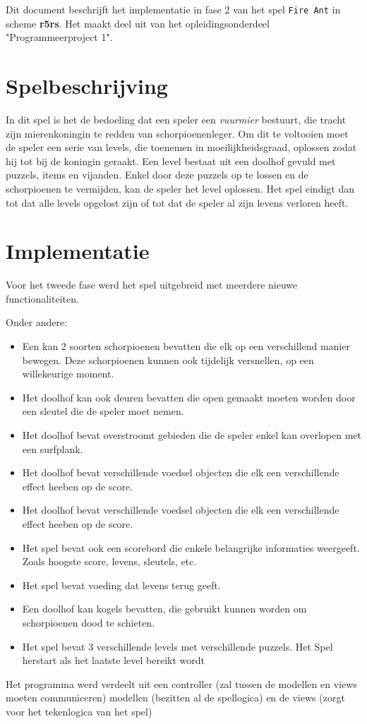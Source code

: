 Dit document beschrijft het implementatie in fase 2 van het spel \texttt{Fire Ant} in scheme \textbf{r5rs}.
Het maakt deel uit van het opleidingsonderdeel "Programmeerproject 1".

\section{Spelbeschrijving}
In dit spel is het de bedoeling dat een speler een \textit{vuurmier} bestuurt,
die tracht zijn mierenkoningin te redden van schorpioenenleger.
Om dit te voltooien moet de speler een serie van levels, die toenemen in moeilijkheidsgraad,
oplossen zodat hij tot bij de koningin geraakt.
Een level bestaat uit een doolhof gevuld met puzzels, items en vijanden.
Enkel door deze puzzels op te lossen en de schorpioenen te vermijden, kan de speler het level oplossen.
Het spel eindigt dan tot dat alle levels opgelost zijn of tot dat de speler al zijn levens verloren heeft.

\section{Implementatie}
Voor het tweede fase werd het spel uitgebreid met meerdere nieuwe functionaliteiten.

Onder andere:
\begin{itemize}
	\item Een kan 2 soorten schorpioenen bevatten die elk op een verschillend manier bewegen.
		Deze schorpioenen kunnen ook tijdelijk versnellen, op een willekeurige moment.
	\item	Het doolhof kan ook deuren bevatten die open gemaakt moeten worden door een sleutel die de speler moet nemen.
	\item Het doolhof bevat overstroomt gebieden die de speler enkel kan overlopen met een surfplank.
	\item Het doolhof bevat verschillende voedsel objecten die elk een verschillende effect heeben op de score.
	\item Het doolhof bevat verschillende voedsel objecten die elk een verschillende effect heeben op de score.
	\item Het spel bevat ook een scorebord die enkele belangrijke informaties weergeeft.
		Zoals hoogste score, levens, sleutels, etc.
	\item Het spel bevat voeding dat levens terug geeft.
	\item Een doolhof kan kogels bevatten, die gebruikt kunnen worden om schorpioenen dood te schieten.
	\item Het spel bevat 3 verschillende levels met verschillende puzzels.
		Het Spel herstart als het laatste level bereikt wordt
\end{itemize}

Het programma werd verdeelt uit
een controller (zal tussen de modellen en views moeten communiceren)
modellen (bezitten al de spellogica)
en de views (zorgt voor het tekenlogica van het spel)

